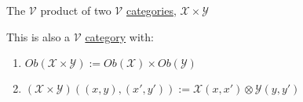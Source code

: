 The $\mathcal{V}$ product of two $\mathcal{V}$ \hyperref[D2.46]{categories}, $\mathcal{X} \times \mathcal{Y}$

This is also a $\mathcal{V}$ \hyperref[D2.46]{category} with:
\begin{enumerate}
  \item $Ob(\mathcal{X}\times\mathcal{Y}) := Ob(\mathcal{X})\times Ob(\mathcal{Y})$
  \item $(\mathcal{X} \times \mathcal{Y})((x,y),(x',y')) := \mathcal{X}(x,x') \otimes \mathcal{Y}(y,y')$
\end{enumerate}
